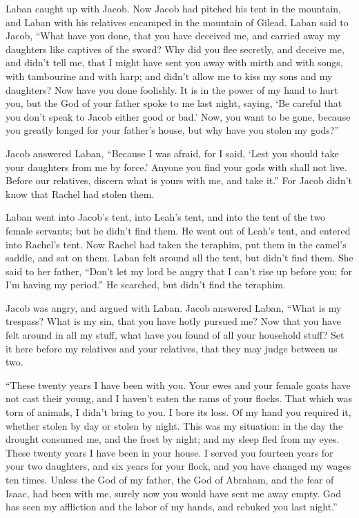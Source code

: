  Laban caught up with Jacob. Now Jacob had pitched his tent
in the mountain, and Laban with his relatives encamped in the mountain
of Gilead.  Laban said to Jacob, ``What have you done, that
you have deceived me, and carried away my daughters like captives of the
sword?  Why did you flee secretly, and deceive me, and
didn't tell me, that I might have sent you away with mirth and with
songs, with tambourine and with harp;  and didn't allow me
to kiss my sons and my daughters? Now have you done foolishly.
 It is in the power of my hand to hurt you, but the God of
your father spoke to me last night, saying, `Be careful that you don't
speak to Jacob either good or bad.'  Now, you want to be
gone, because you greatly longed for your father's house, but why have
you stolen my gods?''

 Jacob answered Laban, ``Because I was afraid, for I said,
`Lest you should take your daughters from me by force.' 
Anyone you find your gods with shall not live. Before our relatives,
discern what is yours with me, and take it.'' For Jacob didn't know that
Rachel had stolen them.

 Laban went into Jacob's tent, into Leah's tent, and into
the tent of the two female servants; but he didn't find them. He went
out of Leah's tent, and entered into Rachel's tent.  Now
Rachel had taken the teraphim, put them in the camel's saddle, and sat
on them. Laban felt around all the tent, but didn't find them.
 She said to her father, ``Don't let my lord be angry that
I can't rise up before you; for I'm having my period.'' He searched, but
didn't find the teraphim.

 Jacob was angry, and argued with Laban. Jacob answered
Laban, ``What is my trespass? What is my sin, that you have hotly
pursued me?  Now that you have felt around in all my stuff,
what have you found of all your household stuff? Set it here before my
relatives and your relatives, that they may judge between us two.

 ``These twenty years I have been with you. Your ewes and
your female goats have not cast their young, and I haven't eaten the
rams of your flocks.  That which was torn of animals, I
didn't bring to you. I bore its loss. Of my hand you required it,
whether stolen by day or stolen by night.  This was my
situation: in the day the drought consumed me, and the frost by night;
and my sleep fled from my eyes.  These twenty years I have
been in your house. I served you fourteen years for your two daughters,
and six years for your flock, and you have changed my wages ten times.
 Unless the God of my father, the God of Abraham, and the
fear of Isaac, had been with me, surely now you would have sent me away
empty. God has seen my affliction and the labor of my hands, and rebuked
you last night.''

